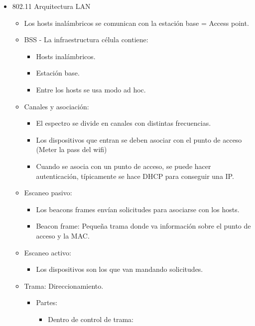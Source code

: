 \documentclass[12pt, twoside, openright]{report} %
\begin{document}
\begin{itemize}
	\item 802.11 Arquitectura LAN
	      \begin{itemize}
		      \item Los hosts inalámbricos se comunican con la estación base = Access point.
		      \item BSS - La infraestructura célula contiene:
		            \begin{itemize}
			            \item Hosts inalámbricos.
			            \item Estación base.
			            \item Entre los hosts se usa modo ad hoc.
		            \end{itemize}

		      \item Canales y asociación:
		            \begin{itemize}
			            \item El espectro se divide en canales con distintas frecuencias.
			            \item Los dispositivos que entran se deben asociar con el punto de acceso (Meter la pass del wifi)
			            \item Cuando se asocia con un punto de acceso, se puede hacer autenticación, típicamente se hace DHCP para conseguir una IP.
		            \end{itemize}
		      \item Escaneo pasivo:
		            \begin{itemize}
			            \item Los beacons frames envían solicitudes para asociarse con los hosts.
			            \item Beacon frame: Pequeña trama donde va información sobre el punto de acceso y la MAC.
		            \end{itemize}

		      \item Escaneo activo:
		            \begin{itemize}
			            \item Los dispositivos son los que van mandando solicitudes.
		            \end{itemize}
		            \pagebreak
		      \item Trama: Direccionamiento.
		            \begin{itemize}
			            \item Partes:
			                  \begin{itemize}
				                  \item Dentro de control de trama:


\end{itemize}
\end{itemize}
\end{itemize}
\end{itemize}
\end{document}
